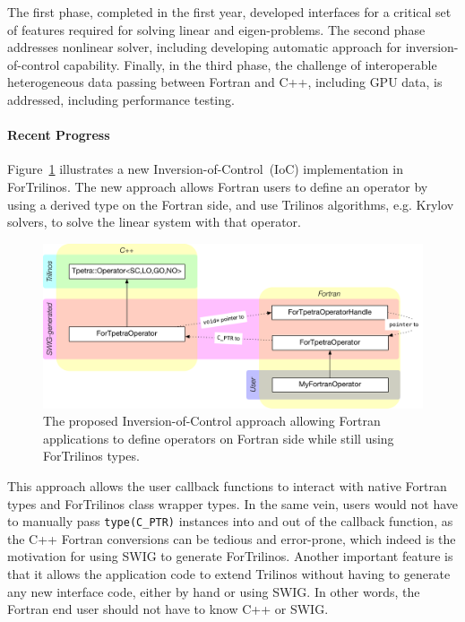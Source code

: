 The first phase, completed in the first year, developed interfaces for a critical set of features required for solving linear and eigen-problems. The second phase addresses nonlinear solver, including developing automatic approach for inversion-of-control capability. Finally, in the third phase, the challenge of interoperable heterogeneous data passing between Fortran and C++, including GPU data, is addressed, including performance testing.

\paragraph{Recent Progress}

Figure~\ref{fig:fortran_ioc} illustrates a new Inversion-of-Control~(IoC)
implementation in ForTrilinos. The new approach allows Fortran users to define
an operator by using a derived type on the Fortran side, and use Trilinos
algorithms, e.g. Krylov solvers, to solve the linear system with that operator.

\begin{figure}[htb]
    \centering
    \includegraphics[scale=0.8,width=6in]{projects/2.3.3-MathLibs/2.3.3.08-ForTrilinos/ForTrilinos_ioc}
    \caption{\label{fig:fortran_ioc}The proposed Inversion-of-Control approach
    allowing Fortran applications to define operators on Fortran side while
    still using ForTrilinos types.}
\end{figure}

This approach allows the user callback functions to interact with native Fortran
types and ForTrilinos class wrapper types. In the same vein, users would not
have to manually pass \texttt{type(C\_PTR)} instances into and out of the
callback function, as the C++ Fortran conversions can be tedious and
error-prone, which indeed is the motivation for using SWIG to generate
ForTrilinos.  Another important feature is that it allows the application code
to extend Trilinos without having to generate any new interface code, either by
hand or using SWIG. In other words, the Fortran end user should not have to know
C++ or SWIG.

